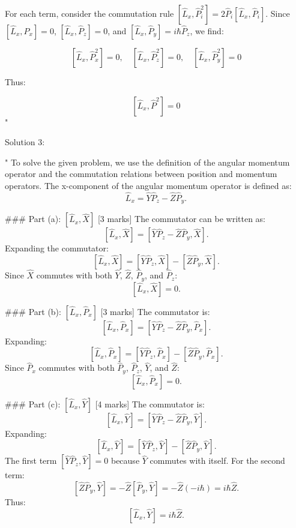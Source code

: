 For each term, consider the commutation rule \([\hat{L}_x, \hat{P}_i^2] = 2\hat{P}_i [\hat{L}_x, \hat{P}_i]\). Since \([\hat{L}_x, \hat{P}_x] = 0\), \([\hat{L}_x, \hat{P}_z] = 0\), and \([\hat{L}_x, \hat{P}_y] = i\hbar \hat{P}_z\), we find:

\[
\left[\hat{L}_x, \hat{P}_x^2\right] = 0, \quad \left[\hat{L}_x, \hat{P}_z^2\right] = 0, \quad \left[\hat{L}_x, \hat{P}_y^2\right] = 0
\]

Thus:

\[
\left[\hat{L}_x, \hat{P}^2\right] = 0
\]
"

Solution 3: 

"
To solve the given problem, we use the definition of the angular momentum operator and the commutation relations between position and momentum operators. The x-component of the angular momentum operator is defined as:
\[
\hat{L}_x = \hat{Y}\hat{P}_z - \hat{Z}\hat{P}_y.
\]

### Part (a): \(\left[\hat{L}_x, \hat{X}\right]\) [3 marks]
The commutator can be written as:
\[
\left[\hat{L}_x, \hat{X}\right] = \left[\hat{Y}\hat{P}_z - \hat{Z}\hat{P}_y, \hat{X}\right].
\]
Expanding the commutator:
\[
\left[\hat{L}_x, \hat{X}\right] = \left[\hat{Y}\hat{P}_z, \hat{X}\right] - \left[\hat{Z}\hat{P}_y, \hat{X}\right].
\]
Since \(\hat{X}\) commutes with both \(\hat{Y}\), \(\hat{Z}\), \(\hat{P}_y\), and \(\hat{P}_z\):
\[
\left[\hat{L}_x, \hat{X}\right] = 0.
\]

### Part (b): \(\left[\hat{L}_x, \hat{P}_x\right]\) [3 marks]
The commutator is:
\[
\left[\hat{L}_x, \hat{P}_x\right] = \left[\hat{Y}\hat{P}_z - \hat{Z}\hat{P}_y, \hat{P}_x\right].
\]
Expanding:
\[
\left[\hat{L}_x, \hat{P}_x\right] = \left[\hat{Y}\hat{P}_z, \hat{P}_x\right] - \left[\hat{Z}\hat{P}_y, \hat{P}_x\right].
\]
Since \(\hat{P}_x\) commutes with both \(\hat{P}_y\), \(\hat{P}_z\), \(\hat{Y}\), and \(\hat{Z}\):
\[
\left[\hat{L}_x, \hat{P}_x\right] = 0.
\]

### Part (c): \(\left[\hat{L}_x, \hat{Y}\right]\) [4 marks]
The commutator is:
\[
\left[\hat{L}_x, \hat{Y}\right] = \left[\hat{Y}\hat{P}_z - \hat{Z}\hat{P}_y, \hat{Y}\right].
\]
Expanding:
\[
\left[\hat{L}_x, \hat{Y}\right] = \left[\hat{Y}\hat{P}_z, \hat{Y}\right] - \left[\hat{Z}\hat{P}_y, \hat{Y}\right].
\]
The first term \(\left[\hat{Y}\hat{P}_z, \hat{Y}\right] = 0\) because \(\hat{Y}\) commutes with itself. For the second term:
\[
\left[\hat{Z}\hat{P}_y, \hat{Y}\right] = -\hat{Z}\left[\hat{P}_y, \hat{Y}\right] = -\hat{Z}(-i\hbar) = i\hbar\hat{Z}.
\]
Thus:
\[
\left[\hat{L}_x, \hat{Y}\right] = i\hbar\hat{Z}.
\]

